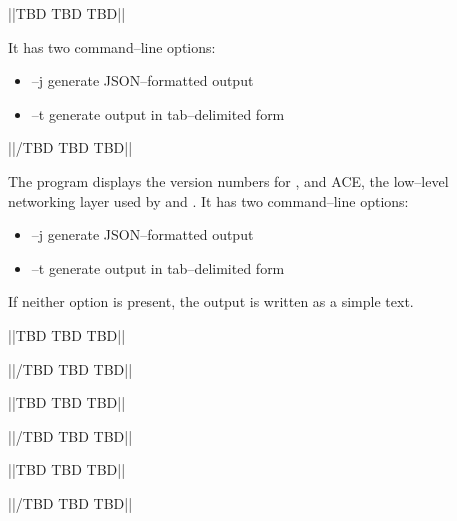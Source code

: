 
			||TBD TBD TBD||

It has two command--line options:
\begin{itemize}
\item --j generate JSON--formatted output
\item --t generate output in tab--delimited form
\end{itemize}
			||/TBD TBD TBD||



The program  displays the version numbers for \mplusm{}, \yarp{}
and ACE, the low--level networking layer used by \mplusm{} and \yarp{}.
It has two command--line options:
\begin{itemize}
\item --j generate JSON--formatted output
\item --t generate output in tab--delimited form
\end{itemize}

If neither option is present, the output is written as a simple text.


\secondaryEnd{}


			||TBD TBD TBD||

			||/TBD TBD TBD||


			||TBD TBD TBD||

			||/TBD TBD TBD||



			||TBD TBD TBD||

			||/TBD TBD TBD||


\secondaryEnd{}

\primaryEnd{}
